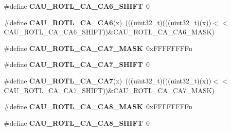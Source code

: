 \begin{DoxyCompactItemize}
\item 
\#define {\bfseries C\+A\+U\+\_\+\+R\+O\+T\+L\+\_\+\+C\+A\+\_\+\+C\+A6\+\_\+\+S\+H\+I\+FT}~0\hypertarget{group__CAU__Register__Masks_ga1185b9302856e4d9138c798916b4cb6f}{}\label{group__CAU__Register__Masks_ga1185b9302856e4d9138c798916b4cb6f}

\item 
\#define {\bfseries C\+A\+U\+\_\+\+R\+O\+T\+L\+\_\+\+C\+A\+\_\+\+C\+A6}(x)~(((uint32\+\_\+t)(((uint32\+\_\+t)(x))$<$$<$C\+A\+U\+\_\+\+R\+O\+T\+L\+\_\+\+C\+A\+\_\+\+C\+A6\+\_\+\+S\+H\+I\+FT))\&C\+A\+U\+\_\+\+R\+O\+T\+L\+\_\+\+C\+A\+\_\+\+C\+A6\+\_\+\+M\+A\+SK)\hypertarget{group__CAU__Register__Masks_ga28aed5ce2b04ab3e83f41f2b7652836c}{}\label{group__CAU__Register__Masks_ga28aed5ce2b04ab3e83f41f2b7652836c}

\item 
\#define {\bfseries C\+A\+U\+\_\+\+R\+O\+T\+L\+\_\+\+C\+A\+\_\+\+C\+A7\+\_\+\+M\+A\+SK}~0x\+F\+F\+F\+F\+F\+F\+F\+Fu\hypertarget{group__CAU__Register__Masks_gadd2dfc00072ea9bfc8693db4bdf349c0}{}\label{group__CAU__Register__Masks_gadd2dfc00072ea9bfc8693db4bdf349c0}

\item 
\#define {\bfseries C\+A\+U\+\_\+\+R\+O\+T\+L\+\_\+\+C\+A\+\_\+\+C\+A7\+\_\+\+S\+H\+I\+FT}~0\hypertarget{group__CAU__Register__Masks_ga6fc3bc4fdde8ba6f026800de3795b23f}{}\label{group__CAU__Register__Masks_ga6fc3bc4fdde8ba6f026800de3795b23f}

\item 
\#define {\bfseries C\+A\+U\+\_\+\+R\+O\+T\+L\+\_\+\+C\+A\+\_\+\+C\+A7}(x)~(((uint32\+\_\+t)(((uint32\+\_\+t)(x))$<$$<$C\+A\+U\+\_\+\+R\+O\+T\+L\+\_\+\+C\+A\+\_\+\+C\+A7\+\_\+\+S\+H\+I\+FT))\&C\+A\+U\+\_\+\+R\+O\+T\+L\+\_\+\+C\+A\+\_\+\+C\+A7\+\_\+\+M\+A\+SK)\hypertarget{group__CAU__Register__Masks_gaac333466a6b16549053da2d64b733f16}{}\label{group__CAU__Register__Masks_gaac333466a6b16549053da2d64b733f16}

\item 
\#define {\bfseries C\+A\+U\+\_\+\+R\+O\+T\+L\+\_\+\+C\+A\+\_\+\+C\+A8\+\_\+\+M\+A\+SK}~0x\+F\+F\+F\+F\+F\+F\+F\+Fu\hypertarget{group__CAU__Register__Masks_ga4453f2b5a0d2dd265cf121960804c8a7}{}\label{group__CAU__Register__Masks_ga4453f2b5a0d2dd265cf121960804c8a7}

\item 
\#define {\bfseries C\+A\+U\+\_\+\+R\+O\+T\+L\+\_\+\+C\+A\+\_\+\+C\+A8\+\_\+\+S\+H\+I\+FT}~0\hypertarget{group__CAU__Register__Masks_ga36c108071b9cf5eef7d56d3b6c5bfbf8}{}\label{group__CAU__Register__Masks_ga36c108071b9cf5eef7d56d3b6c5bfbf8}


\end{DoxyCompactItemize}

